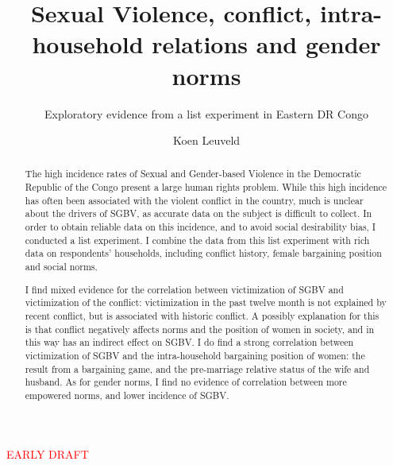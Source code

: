 \documentclass[10pt,a4paper,abstract=on]{scrartcl} %
\begin{document}
\author{Koen Leuveld}




\title{Sexual Violence, conflict, intra-household relations and gender norms}
\subtitle{Exploratory evidence from a list experiment in Eastern DR Congo} %

\maketitle

\begin{center}
\textcolor{red}{\Large EARLY DRAFT}
\end{center}

\begin{abstract}
The high incidence rates of Sexual and Gender-based Violence in the Democratic Republic of the Congo present a large human rights problem. While this high incidence has often been associated with the violent conflict in the country, much is unclear about the drivers of SGBV, as accurate data on the subject is difficult to collect. In order to obtain reliable data on this incidence, and to avoid social desirability bias, I conducted a list experiment. I combine the data from this list experiment with rich data on respondents' households, including conflict history, female bargaining position and social norms. 

I find mixed evidence for the correlation between victimization of SGBV and victimization of the conflict: victimization in the past twelve month is not explained by recent conflict, but is associated with historic conflict. A possibly explanation for this is that conflict negatively affects norms and the position of women in society, and in this way has an indirect effect on SGBV. I do find a strong correlation between victimization of SGBV and the intra-household bargaining position of women: the result from a bargaining game, and the pre-marriage relative status of the wife and husband. As for gender norms, I find no evidence of correlation between more empowered norms, and lower incidence of SGBV.
\end{abstract}
\end{document}
